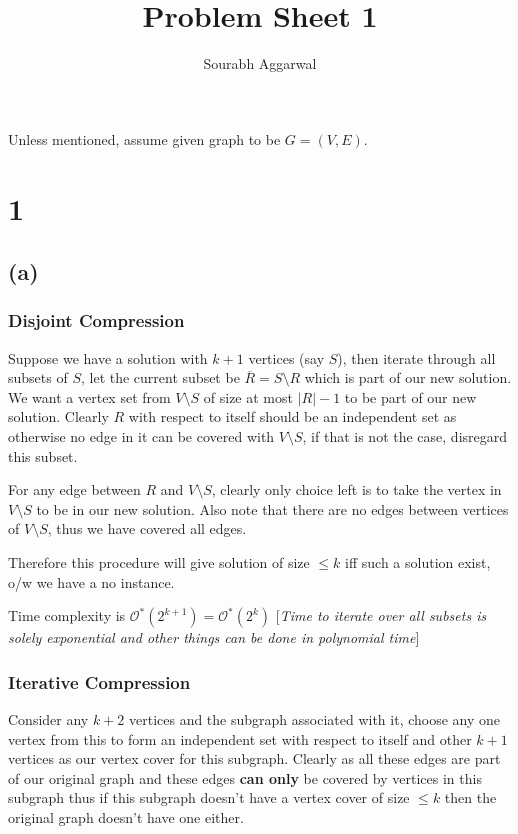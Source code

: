\documentclass[12pt,3p]{elsarticle}
\begin{document}
\begin{frontmatter}

\title{ Problem Sheet 1 }

\author{Sourabh Aggarwal}
\address{111601025@smail.iitpkd.ac.in}

\end{frontmatter}

Unless mentioned, assume given graph to be $G = (V, E)$.

\section{1}

\subsection{(a)}

\subsubsection{Disjoint Compression}

Suppose we have a solution with $k + 1$ vertices (say $S$), then iterate through all subsets of $S$, let the current subset be $\overline{R} = S \setminus R$ which is part of our new solution. We want a vertex set from $V \setminus S$ of size at most $|R| - 1$ to be part of our new solution. Clearly $R$ with respect to itself should be an independent set as otherwise no edge in it can be covered with $V \setminus S$, if that is not the case, disregard this subset. 

For any edge between $R$ and $V \setminus S$, clearly only choice left is to take the vertex in $V \setminus S$ to be in our new solution. Also note that there are no edges between vertices of $V \setminus S$, thus we have covered all edges. 

Therefore this procedure will give solution of size $\leq k$ iff such a solution exist, o/w we have a no instance.

Time complexity is $\mathcal{O}^*(2^{k + 1}) = \mathcal{O}^*(2^k)$ [\textit{Time to iterate over all subsets is solely exponential and other things can be done in polynomial time}]

\subsubsection{Iterative Compression}

Consider any $k + 2$ vertices and the subgraph associated with it, choose any one vertex from this to form an independent set with respect to itself and other $k + 1$ vertices as our vertex cover for this subgraph. Clearly as all these edges are part of our original graph and these edges \textbf{can only} be covered by vertices in this subgraph thus if this subgraph doesn't have a vertex cover of size $\leq k$ then the original graph doesn't have one either.
\end{document}
